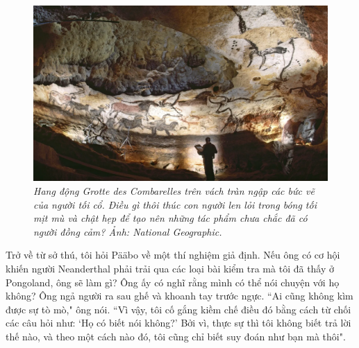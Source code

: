 \begin{multicols}{2}
	\begin{figure}[H]
		\vspace*{-5pt}
		\centering
		\captionsetup{labelformat= empty, justification=centering}
		\includegraphics[width= 1\linewidth]{5}
		\caption{\small\textit{\color{timhieukhoahoc}Hang động Grotte des Combarelles trên vách tràn ngập các bức vẽ của người tối cổ. Điều gì thôi thúc con người len lỏi trong bóng tối mịt mù và chật hẹp để tạo nên những tác phẩm chưa chắc đã có người đồng cảm? Ảnh: National Geographic.}}
		\vspace*{-10pt}
	\end{figure}
	Trở về từ sở thú, tôi hỏi Pääbo về một thí nghiệm giả định. Nếu ông có cơ hội khiến người Neanderthal phải trải qua các loại bài kiểm tra mà tôi đã thấy ở Pongoland, ông sẽ làm gì? Ông ấy có nghĩ rằng mình có thể nói chuyện với họ không? Ông ngả người ra sau ghế và khoanh tay trước ngực.
	\vskip 0.1cm
	``Ai cũng không kìm được sự tò mò," ông nói. ``Vì vậy, tôi cố gắng kiềm chế điều đó bằng cách từ chối các câu hỏi như: `Họ có biết nói không?' Bởi vì, thực sự thì tôi không biết trả lời thế nào, và theo một cách nào đó, tôi cũng chỉ biết suy đoán như bạn mà thôi".
	\vskip 0.1cm

\end{multicols}
